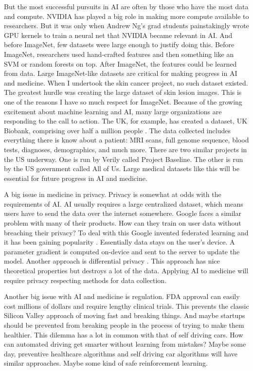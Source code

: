 But the most successful pursuits in AI are often by those who have the most data and compute.  NVIDIA has played a big role in making more compute available to researchers.  But it was only when Andrew Ng's grad students painstakingly wrote GPU kernels to train a neural net \cite{raina2009large} that NVIDIA became relevant in AI. And before ImageNet, few datasets were large enough to justify doing this.  Before ImageNet, researchers used hand-crafted features and then something like an SVM or random forests on top.  After ImageNet, the features could be learned from data.  Large ImageNet-like datasets are critical for making progress in AI and medicine.  When I undertook the skin cancer project, no such dataset existed.  The greatest hurdle was creating the large dataset of skin lesion images.  This is one of the reasons I have so much respect for ImageNet.  Because of the growing excitement about machine learning and AI, many large organizations are responding to the call to action.  The UK, for example, has created a dataset, UK Biobank, comprising over half a million people \cite{sudlow2015uk}.  The data collected includes everything there is know about a patient: MRI scans, full genome sequence, blood tests, diagnoses, demographics, and much more.  There are two similar projects in the US underway.  One is run by Verily called Project Baseline.  The other is run by the US government called All of Us.  Large medical datasets like this will be essential for future progress in AI and medicine.

A big issue in medicine in privacy.  Privacy is somewhat at odds with the requirements of AI.  AI usually requires a large centralized dataset, which means users have to send the data over the internet somewhere.  Google faces a similar problem with many of their products.  How can they train on user data without breaching their privacy?  To deal with this Google invented federated learning and it has been gaining popularity \cite{bonawitz2019towards}.  Essentially data stays on the user's device.  A parameter gradient is computed on-device and sent to the server to update the model.  Another approach is differential privacy \cite{abadi2016deep}.  This approach has nice theoretical properties but destroys a lot of the data.  Applying AI to medicine will require privacy respecting methods for data collection.

Another big issue with AI and medicine is regulation.  FDA approval can easily cost millions of dollars and require lengthy clinical trials.  This prevents the classic Silicon Valley approach of moving fast and breaking things.  And maybe startups should be prevented from breaking people in the process of trying to make them healthier.  This dilemma has a lot in common with that of self driving cars.  How can automated driving get smarter without learning from mistakes?  Maybe some day, preventive healthcare algorithms and self driving car algorithms will have similar approaches.  Maybe some kind of safe reinforcement learning.

